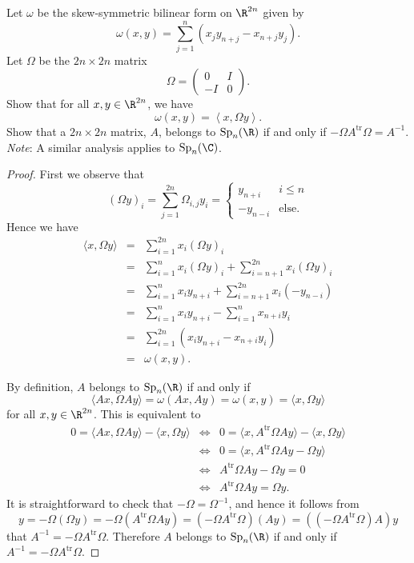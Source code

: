\documentclass[10pt]{amsart}
\begin{document}
\begin{ex}
  Let $\omega$ be the skew-symmetric bilinear form on $\R^{2n}$ given by 
  $$\omega(x,y) = \sum_{j = 1}^n (x_jy_{n + j} - x_{n+j}y_j).$$
  Let $\Omega$ be the $2n \times 2n$ matrix
  $$\Omega = \left(\begin{matrix}
    0 & I\\
    -I & 0
    \end{matrix}\right).$$
  Show that for all $x,y \in \R^{2n}$, we have
  $$\omega(x,y) = \left<x, \Omega y\right>.$$
  Show that a $2n \times 2n$ matrix, $A$, belongs to $\operatorname{Sp}_n(\R)$ if and only if $-\Omega A^\text{tr} \Omega = A^{-1}$.\\
  {\it Note}: A similar analysis applies to $\operatorname{Sp}_n(\C)$.
  \begin{proof}
    First we observe that 
    $$\left(\Omega y\right)_{i} = \sum_{j = 1}^{2n} \Omega_{i,j}y_i 
    = \left\{
    \begin{array}{cc}
      y_{n + i} & i \leq n\\
      -y_{n - i} & \text{else}.
    \end{array}
    \right.$$
    Hence we have
    \begin{eqnarray*}
      \langle x, \Omega y \rangle &=& \sum_{i=1}^{2n} x_i(\Omega y)_i \\
      &=& \sum_{i=1}^{n} x_i(\Omega y)_i + \sum_{i=n+1}^{2n} x_i(\Omega y)_i \\
      &=& \sum_{i=1}^{n} x_iy_{n+i} + \sum_{i=n+1}^{2n} x_i(-y_{n -i})\\
      &=& \sum_{i=1}^{n} x_iy_{n+i} - \sum_{i=1}^{n} x_{n + i}y_{i}\\
      &=& \sum_{i=1}^{2n} \left(x_iy_{n+i} - x_{n + i} y_{i}\right)\\
      &=& \omega(x,y).
    \end{eqnarray*}

    By definition, $A$ belongs to $\operatorname{Sp}_n(\R)$ if and only if 
    $$\langle Ax, \Omega Ay\rangle = \omega(Ax,Ay) = \omega(x,y) = \langle x, \Omega y\rangle$$ for all $x,y \in \R^{2n}$.
    This is equivalent to 
    \begin{eqnarray*}
      0 = \langle Ax, \Omega Ay\rangle - \langle x, \Omega y\rangle
      &\iff& 0 = \langle x, A^\text{tr}\Omega Ay\rangle - \langle x, \Omega y\rangle\\
      &\iff& 0 = \langle x, A^\text{tr}\Omega Ay - \Omega y\rangle\\
      &\iff& A^\text{tr}\Omega Ay - \Omega y = 0\\
      &\iff& A^\text{tr}\Omega Ay = \Omega y.
    \end{eqnarray*}
    It is straightforward to check that $-\Omega = \Omega^{-1}$, and hence it follows from
    $$y = -\Omega(\Omega y) = 
    -\Omega(A^\text{tr}\Omega A y)
    = (-\Omega A^\text{tr}\Omega)(Ay)
    = ((-\Omega A^\text{tr}\Omega)A)y$$
    that $A^{-1} = -\Omega A^\text{tr} \Omega$.
    Therefore $A$ belongs to $\operatorname{Sp}_n(\R)$ if and only if $A^{-1} = -\Omega A^\text{tr} \Omega$.
  \end{proof}
\end{ex}
\end{document}
